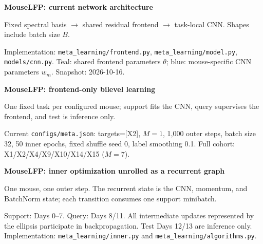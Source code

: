 \documentclass[10pt]{article}
\newcommand{\heading}[2]{%
  {\LARGE\bfseries\color{ink}#1}\par\vspace{2mm}
  {\small\color{fixed}#2}\par\vspace{2mm}}
\begin{document}
\heading{MouseLFP: current network architecture}{%
  Fixed spectral basis \(\longrightarrow\) shared residual frontend
  \(\longrightarrow\) task-local CNN. Shapes include batch size \(B\).}
\begin{center}

\end{center}
\vfill
{\scriptsize\color{fixed}
  Implementation: \texttt{meta\_learning/frontend.py},
  \texttt{meta\_learning/model.py}, \texttt{models/cnn.py}.
  Teal: shared frontend parameters \(\theta\); blue: mouse-specific CNN parameters \(w_m\).
  Snapshot: 2026-10-16.}

\newpage
\heading{MouseLFP: frontend-only bilevel learning}{%
  One fixed task per configured mouse; support fits the CNN, query supervises the frontend,
  and test is inference only.}
\begin{center}

\end{center}
\vfill
{\scriptsize\color{fixed}
  Current \texttt{configs/meta.json}: targets=[X2], \(M=1\), 1,000 outer steps,
  batch size 32, 50 inner epochs, fixed shuffle seed 0, label smoothing 0.1.
  Full cohort: X1/X2/X4/X9/X10/X14/X15 (\(M=7\)).}

\newpage
\heading{MouseLFP: inner optimization unrolled as a recurrent graph}{%
  One mouse, one outer step. The recurrent state is the CNN, momentum, and BatchNorm state;
  each transition consumes one support minibatch.}
\begin{center}

\end{center}
\vfill
{\scriptsize\color{fixed}
  Support: Days 0--7. Query: Days 8/11. All intermediate updates represented by the ellipsis
  participate in backpropagation. Test Days 12/13 are inference only.
  Implementation: \texttt{meta\_learning/inner.py} and \texttt{meta\_learning/algorithms.py}.}
\end{document}
